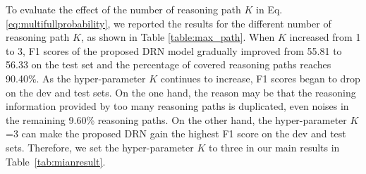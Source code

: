 \documentclass[11pt,a4paper]{article}
\begin{document}
\label{sec4-4}
\begin{table}[h]
\centering
{}
\caption{The effect of the number of reasoning paths $K$ for the proposed DRN model.}
\label{table:max_path} 
\end{table}
To evaluate the effect of the number of reasoning path $K$ in Eq.\ref{eq:multifullprobability}, we reported the results for the different number of reasoning path $K$, as shown in Table \ref{table:max_path}.
When $K$ increased from 1 to 3, F1 scores of the proposed DRN model gradually improved from 55.81 to 56.33 on the test set and the percentage of covered reasoning paths reaches 90.40\%.
As the hyper-parameter $K$ continues to increase, F1 scores began to drop on the dev and test sets.
On the one hand, the reason may be that the reasoning information provided by too many reasoning paths is duplicated, even noises in the remaining 9.60\% reasoning paths.
On the other hand, the hyper-parameter $K$=3 can make the proposed DRN gain the highest F1 score on the dev and test sets.
Therefore, we set the hyper-parameter $K$ to three in our main results in Table~\ref{tab:mianresult}.
\end{document}
